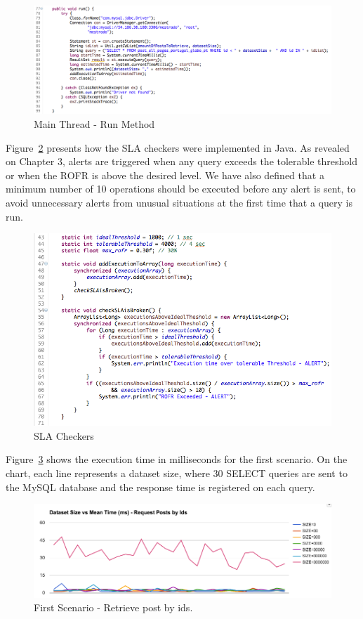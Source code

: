 \begin{figure}[ht!]
\centering
\includegraphics[width=150mm]{Imagens/core-execution-01-2.png}
\caption{Main Thread - Run Method \label{fig:core-execution-01.2}}
\end{figure}


Figure~\ref{fig:core-execution-01.3} presents how the SLA checkers were implemented in Java. As revealed on Chapter 3, alerts are triggered when any query exceeds the tolerable threshold or when the ROFR is above the desired level. We have also defined that a minimum number of 10 operations should be executed before any alert is sent, to avoid unnecessary alerts from unusual situations at the first time that a query is run.

\begin{figure}[ht!]
\centering
\includegraphics[width=120mm]{Imagens/core-execution-01-3.png}
\caption{SLA Checkers \label{fig:core-execution-01.3}}
\end{figure}


Figure~\ref{fig:first_scenario} shows the execution time in milliseconds for the first scenario. On the chart, each line represents a dataset size, where 30 SELECT queries are sent to the MySQL database and the response time is registered on each query.

\begin{figure}
\centering
\includegraphics[width=150mm]{Imagens/execution-01.png}
\caption{First Scenario - Retrieve post by ids.\label{fig:first_scenario}}
\end{figure}

